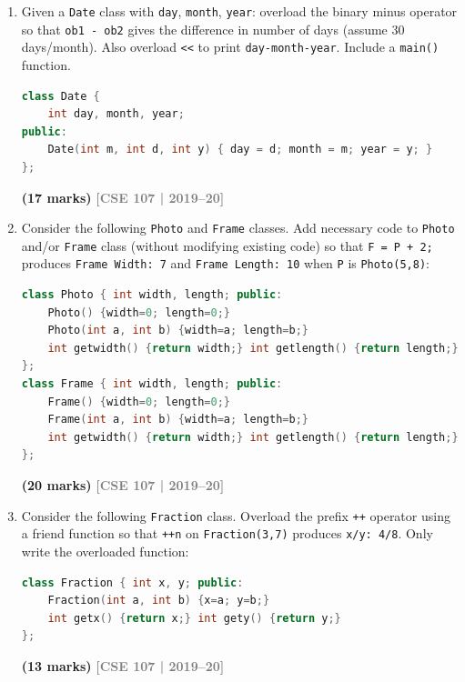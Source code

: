 \documentclass[12pt,a3paper]{article}
\newcommand{\yr}[1]{\hfill\textcolor{gray}{\small\textbf{[#1]}}}
\newcommand{\mk}[1]{\textcolor{orange!70!black}{\small\textbf{(#1 marks)}}}
\begin{document}
\begin{enumerate}



\item Given a \texttt{Date} class with \texttt{day}, \texttt{month}, \texttt{year}: overload the binary minus operator so that \texttt{ob1 - ob2} gives the difference in number of days (assume 30 days/month). Also overload \texttt{<<} to print \texttt{day-month-year}. Include a \texttt{main()} function.
\begin{lstlisting}[language=C++]
class Date {
    int day, month, year;
public:
    Date(int m, int d, int y) { day = d; month = m; year = y; }
};
\end{lstlisting}
\mk{17}
\yr{CSE 107 | 2019--20}





\item Consider the following \texttt{Photo} and \texttt{Frame} classes. Add necessary code to \texttt{Photo} and/or \texttt{Frame} class (without modifying existing code) so that \texttt{F = P + 2;} produces \texttt{Frame Width: 7} and \texttt{Frame Length: 10} when \texttt{P} is \texttt{Photo(5,8)}:
\begin{lstlisting}[language=C++]
class Photo { int width, length; public:
    Photo() {width=0; length=0;}
    Photo(int a, int b) {width=a; length=b;}
    int getwidth() {return width;} int getlength() {return length;}
};
class Frame { int width, length; public:
    Frame() {width=0; length=0;}
    Frame(int a, int b) {width=a; length=b;}
    int getwidth() {return width;} int getlength() {return length;}
};
\end{lstlisting}
\mk{20}
\yr{CSE 107 | 2019--20}





\item Consider the following \texttt{Fraction} class. Overload the prefix \texttt{++} operator using a friend function so that \texttt{++n} on \texttt{Fraction(3,7)} produces \texttt{x/y: 4/8}. Only write the overloaded function:
\begin{lstlisting}[language=C++]
class Fraction { int x, y; public:
    Fraction(int a, int b) {x=a; y=b;}
    int getx() {return x;} int gety() {return y;}
};
\end{lstlisting}
\mk{13}
\yr{CSE 107 | 2019--20}


\end{enumerate}
\end{document}
